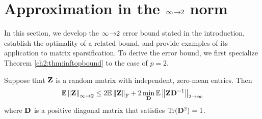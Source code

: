 \section{Approximation in the $\infty\!\rightarrow\!\!2$ norm}

\label{ch2:sec:inf2norm}

In this section, we develop the $\infty\!\rightarrow\!\!2$ error bound stated in the
introduction, establish the optimality of a related bound, and provide examples
of its application to matrix sparsification. To derive the error bound, we first
specialize Theorem \ref{ch2:thm:inftopbound} to the case of $p=2$.

\begin{thm}
Suppose that $\mathbf{Z}$ is a random matrix with independent, zero-mean entries.
Then 
\[
\mathbb{E}\left\|\mathbf{Z}\right\|_{\infty\rightarrow 2}\leq2\mathbb{E}\left\|\mathbf{Z}\right\|_{\mathrm{F}}+2\min_{\mathbf{D}}\mathbb{E}\left\|\mathbf{Z}\mathbf{D}
^{-1}\right\|_{2\rightarrow\infty}
\]
where $\mathbf{D}$ is a positive diagonal matrix that satisfies
$\operatorname{Tr}(\mathbf{D}^{2})=1$.
\label{ch2:thm:inf2errbound}
\end{thm}
